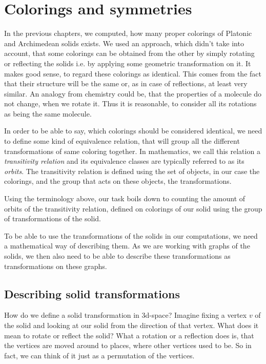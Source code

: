 \chapter{Colorings and symmetries}

In the previous chapters, we computed, how many proper colorings of Platonic and Archimedean solids exists. We used an approach, which didn't take into account, that some colorings can be obtained from the other by simply rotating or reflecting the solids i.e. by applying some geometric transformation on it. It makes good sense, to regard these colorings as identical. This comes from the fact that their structure will be the same or, as in case of reflections, at least very similar. An analogy from chemistry could be, that the properties of a molecule do not change, when we rotate it. Thus it is reasonable, to consider all its rotations as being the same molecule. 

In order to be able to say, which colorings should be considered identical, we need to define some kind of equivalence relation, that will group all the different transformations of same coloring together. In mathematics, we call this relation a \textit{transitivity relation} and its equivalence classes are typically referred to as its \textit{orbits}. The transitivity relation is defined using the set of objects, in our case the colorings, and the group that acts on these objects, the transformations.

Using the terminology above, our task boils down to counting the amount of orbits of the transitivity relation, defined on colorings of our solid using the group of transformations of the solid.

To be able to use the transformations of the solids in our computations, we need a mathematical way of describing them. As we are working with graphs of the solids, we then also need to be able to describe these transformations as transformations on these graphs.

\section{Describing solid transformations}

How do we define a solid transformation in 3d-space? Imagine fixing a vertex $v$ of the solid and looking at our solid from the direction of that vertex. What does it mean to rotate or reflect the solid? What a rotation or a reflection does is, that the vertices are moved around to places, where other vertices used to be. So in fact, we can think of it just as a permutation of the vertices. 

